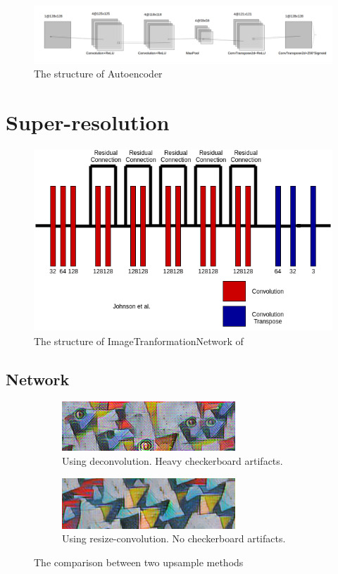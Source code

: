 \documentclass[a4paper,12pt,twoside]{report}
\begin{document}
\begin{figure}
  \centering
  \includegraphics[width=\textwidth]{autoencoder.png}
  \caption{The structure of Autoencoder}
  \label{autoencoder}
\end{figure}

\section{Super-resolution}
\begin{figure}
	\centering
	\includegraphics[scale=0.5]{ITN.png}
	\caption{The structure of ImageTranformationNetwork of \cite{johnson2016perceptual}}
\end{figure}
\subsection{Network}
\begin{figure}
	\centering
	\begin{subfigure}{0.49\textwidth}
		\centering
		\includegraphics[scale=0.6]{style_artifacts.png}
		\caption{Using deconvolution. Heavy checkerboard artifacts.}
	\end{subfigure}
	\begin{subfigure}{0.49\textwidth}
		\centering
		\includegraphics[scale=0.6]{style_clean.png}
		\caption{Using resize-convolution. No checkerboard artifacts.}
	\end{subfigure}
	\caption{The comparison between two upsample methods\cite{odena2016deconvolution}}
	\label{checkerboard}
\end{figure}
\end{document}
